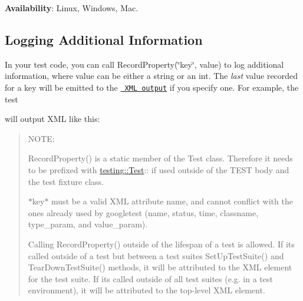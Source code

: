{\bfseries{Availability}}\+: Linux, Windows, Mac.

\subsection*{Logging Additional Information}

In your test code, you can call {\ttfamily Record\+Property(\char`\"{}key\char`\"{}, value)} to log additional information, where {\ttfamily value} can be either a string or an {\ttfamily int}. The {\itshape last} value recorded for a key will be emitted to the \href{\#generating-an-xml-report}{\texttt{ X\+ML output}} if you specify one. For example, the test


\begin{DoxyCode}{0}
\DoxyCodeLine{\}}
\end{DoxyCode}


will output X\+ML like this\+:


\begin{DoxyCode}{0}
\DoxyCodeLine{  <\textcolor{keywordtype}{testcase} \textcolor{keyword}{name}=\textcolor{stringliteral}{"MinAndMaxWidgets"} \textcolor{keyword}{status}=\textcolor{stringliteral}{"run"} \textcolor{keyword}{time}=\textcolor{stringliteral}{"0.006"} \textcolor{keyword}{classname}=\textcolor{stringliteral}{"WidgetUsageTest"} \textcolor{keyword}{MaximumWidgets}=\textcolor{stringliteral}{"12"} \textcolor{keyword}{MinimumWidgets}=\textcolor{stringliteral}{"9"} />}
\end{DoxyCode}


\begin{quote}
N\+O\+TE\+:


\begin{DoxyItemize}
\item {\ttfamily Record\+Property()} is a static member of the {\ttfamily Test} class. Therefore it needs to be prefixed with {\ttfamily \mbox{\hyperlink{classtesting_1_1_test}{testing\+::\+Test}}\+:\+:} if used outside of the {\ttfamily T\+E\+ST} body and the test fixture class.
\item {\ttfamily $\ast$key$\ast$} must be a valid X\+ML attribute name, and cannot conflict with the ones already used by googletest ({\ttfamily name}, {\ttfamily status}, {\ttfamily time}, {\ttfamily classname}, {\ttfamily type\+\_\+param}, and {\ttfamily value\+\_\+param}).
\item Calling {\ttfamily Record\+Property()} outside of the lifespan of a test is allowed. If it\textquotesingle{}s called outside of a test but between a test suite\textquotesingle{}s {\ttfamily Set\+Up\+Test\+Suite()} and {\ttfamily Tear\+Down\+Test\+Suite()} methods, it will be attributed to the X\+ML element for the test suite. If it\textquotesingle{}s called outside of all test suites (e.\+g. in a test environment), it will be attributed to the top-\/level X\+ML element. 
\end{DoxyItemize}\end{quote}



